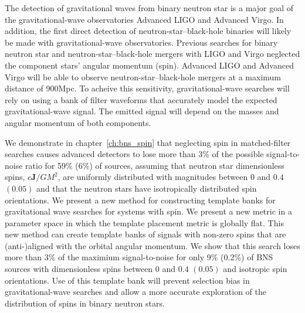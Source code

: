
The detection of gravitational waves from binary neutron star
is a major goal of the gravitational-wave observatories Advanced LIGO and
Advanced Virgo. In addition, the first direct 
detection of neutron-star--black-hole binaries will
likely be made with gravitational-wave observatories.
Previous searches for binary neutron star and neutron-star--black-hole mergers
with LIGO and Virgo
neglected the component stars' angular momentum (spin). Advanced LIGO and
Advanced Virgo will be able to observe neutron-star--black-hole mergers at a
maximum distance of 900Mpc. To acheive this sensitivity, gravitational-wave
searches will rely on using a bank of filter waveforms that
accurately model the expected gravitational-wave signal. The emitted signal
will depend on the masses and angular momentum of both components. 

We demonstrate in chapter~\ref{ch:bns_spin} that neglecting spin in matched-filter searches causes advanced detectors
to lose more than 3\% of the possible signal-to-noise ratio for 59\% (6\%) of
sources, assuming that neutron star dimensionless spins, $c\mathbf{J}/GM^2$, are uniformly distributed
with magnitudes between $0$ and $0.4$ $(0.05)$ and that the neutron stars
have isotropically distributed spin orientations.
We present a new method for constructing template banks for gravitational
wave searches for systems with spin. We present a new metric in a parameter
space in which the template placement metric is globally flat.
This new method can create template banks of signals with
non-zero spins that are (anti-)aligned with the orbital angular momentum.  We show that this search loses more than
3\% of the maximium signal-to-noise for only 9\% (0.2\%) of BNS sources with dimensionless spins between $0$ and $0.4$ $(0.05)$ and isotropic spin orientations. Use of this
template bank will prevent selection bias in gravitational-wave searches and
allow a more accurate exploration of the distribution of spins in binary
neutron stars.

